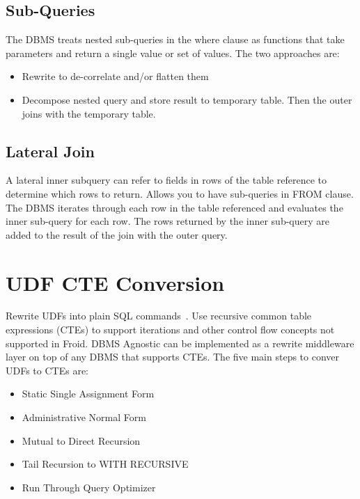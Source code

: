 \documentclass[11pt]{article}
\begin{document}
\subsection*{Sub-Queries}
The DBMS treats nested sub-queries in the where clause as functions that take parameters and return a single value or set of values. The two approaches are:
\begin{itemize}
	\item Rewrite to de-correlate and/or flatten them
	\item Decompose nested query and store result to temporary table. Then the outer joins with the temporary table.
\end{itemize}

\subsection*{Lateral Join}
A lateral inner subquery can refer to fields in rows of the table reference to determine which rows to return. Allows you to have sub-queries in FROM clause. The DBMS iterates through each row in the table referenced and evaluates the inner sub-query for each row. The rows returned by the inner sub-query are added to the result of the join with the outer query. 

\section{UDF CTE Conversion}
Rewrite UDFs into plain SQL commands~\cite{Duta2019}. Use recursive common table expressions (CTEs) to support iterations and other control flow concepts not supported in Froid. DBMS Agnostic can be implemented as a rewrite middleware layer on top of any DBMS that supports CTEs. The five main steps to conver UDFs to CTEs are:
\begin{itemize}
	\item Static Single Assignment Form
	\item Administrative Normal Form
	\item Mutual to Direct Recursion
	\item Tail Recursion to WITH RECURSIVE
	\item Run Through Query Optimizer
\end{itemize}

\newpage


\end{document}
